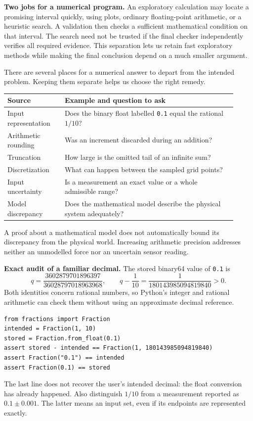 \textbf{Two jobs for a numerical program.} An exploratory calculation may locate
a promising interval quickly, using plots, ordinary floating-point arithmetic,
or a heuristic search. A validation then checks a sufficient mathematical condition
on that interval. The search need not be trusted if the final checker independently
verifies all required evidence. This separation lets us retain fast exploratory
methods while making the final conclusion depend on a much smaller argument.

\newpage
{}
There are several places for a numerical answer to depart from the intended problem.
Keeping them separate helps us choose the right remedy.
\begin{center}\small
\begin{tabular}{@{}p{0.23\linewidth}p{0.69\linewidth}@{}}\toprule
Source & Example and question to ask \\ \midrule
Input representation & Does the binary float labelled \texttt{0.1} equal the rational $1/10$?\\
Arithmetic rounding & Was an increment discarded during an addition?\\
Truncation & How large is the omitted tail of an infinite sum?\\
Discretization & What can happen between the sampled grid points?\\
Input uncertainty & Is a measurement an exact value or a whole admissible range?\\
Model discrepancy & Does the mathematical model describe the physical system adequately?\\ \bottomrule
\end{tabular}
\end{center}
A proof about a mathematical model does not automatically bound its discrepancy
from the physical world. Increasing arithmetic precision addresses neither an
unmodelled force nor an uncertain sensor reading.

\textbf{Exact audit of a familiar decimal.} The stored binary64 value of \texttt{0.1} is
\[
 q=\frac{3602879701896397}{36028797018963968},\qquad
 q-\frac1{10}=\frac1{180143985094819840}>0.
\]
Both identities concern rational numbers, so Python's integer and rational arithmetic
can check them without using an approximate decimal reference.
\begin{lstlisting}
from fractions import Fraction
intended = Fraction(1, 10)
stored = Fraction.from_float(0.1)
assert stored - intended == Fraction(1, 180143985094819840)
assert Fraction("0.1") == intended
assert Fraction(0.1) == stored
\end{lstlisting}
The last line does not recover the user's intended decimal: the float conversion
has already happened. Also distinguish $1/10$ from a measurement reported as
$0.1\pm0.001$. The latter means an input set, even if its endpoints are represented exactly.

